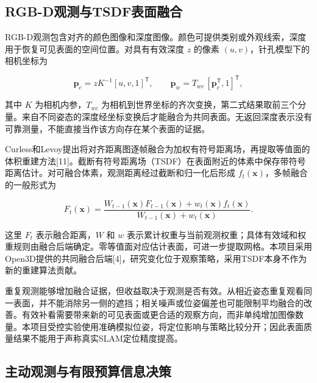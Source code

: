 \documentclass[11pt,a4paper]{article}
\numberwithin{equation}{section}
\begin{document}
\hypertarget{rgb-dux89c2ux6d4bux4e0etsdfux8868ux9762ux878dux5408}{%
\subsection{RGB-D观测与TSDF表面融合}\label{rgb-dux89c2ux6d4bux4e0etsdfux8868ux9762ux878dux5408}}

RGB-D观测包含对齐的颜色图像和深度图像。颜色可提供类别或外观线索，深度用于恢复可见表面的空间位置。对具有有效深度 \(z\) 的像素 \((u,v)\)，针孔模型下的相机坐标为

\begin{equation}
\mathbf p_c=zK^{-1}[u,v,1]^{\mathsf T},\qquad
\mathbf p_w=T_{wc}\,[\mathbf p_c^{\mathsf T},1]^{\mathsf T},
\end{equation}

其中 \(K\) 为相机内参，\(T_{wc}\) 为相机到世界坐标的齐次变换，第二式结果取前三个分量。来自不同姿态的深度经坐标变换后才能融合为共同表面。无返回深度表示没有可靠测量，不能直接当作该方向存在某个表面的证据。

Curless和Levoy提出将对齐距离图逐帧融合为加权有符号距离场，再提取等值面的体积重建方法{[}11{]}。截断有符号距离场（TSDF）在表面附近的体素中保存带符号距离估计。对可融合体素，观测距离经过截断和归一化后形成 \(f_t(\mathbf x)\)，多帧融合的一般形式为

\begin{equation}
F_t(\mathbf x)=
\frac{W_{t-1}(\mathbf x)F_{t-1}(\mathbf x)+w_t(\mathbf x)f_t(\mathbf x)}
{W_{t-1}(\mathbf x)+w_t(\mathbf x)}.
\end{equation}

这里 \(F_t\) 表示融合距离，\(W\) 和 \(w\) 表示累计权重与当前观测权重；具体有效域和权重规则由融合后端确定。零等值面对应估计表面，可进一步提取网格。本项目采用Open3D提供的共同融合后端{[}4{]}，研究变化位于观察策略，采用TSDF本身不作为新的重建算法贡献。

重复观测能够增加融合证据，但收益取决于观测是否有效。从相近姿态重复观看同一表面，并不能消除另一侧的遮挡；相关噪声或位姿偏差也可能限制平均融合的改善。有效补看需要带来新的可见表面或更合适的观察方向，而非单纯增加图像数量。本项目受控实验使用准确模拟位姿，将定位影响与策略比较分开；因此表面质量结果不能用于声称真实SLAM定位精度提高。

\hypertarget{ux4e3bux52a8ux89c2ux6d4bux4e0eux6709ux9650ux9884ux7b97ux4fe1ux606fux51b3ux7b56}{%
\subsection{主动观测与有限预算信息决策}\label{ux4e3bux52a8ux89c2ux6d4bux4e0eux6709ux9650ux9884ux7b97ux4fe1ux606fux51b3ux7b56}}
\end{document}
